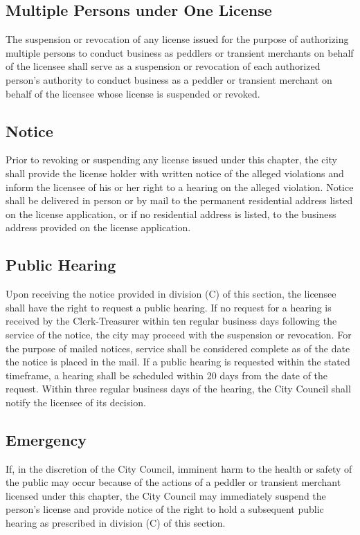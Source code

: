 \subsection{Multiple Persons under One License}
The suspension or revocation of any license issued for the purpose of authorizing multiple persons to conduct business as peddlers or transient merchants on behalf of the licensee shall serve as a suspension or revocation of each authorized person’s authority to conduct business as a peddler or transient merchant on behalf of the licensee whose license is suspended or revoked.
\subsection{Notice}
Prior to revoking or suspending any license issued under this chapter, the city shall provide the license holder with written notice of the alleged violations and inform the licensee of his or her right to a hearing on the alleged violation.  Notice shall be delivered in person or by mail to the permanent residential address listed on the license application, or if no residential address is listed, to the business address provided on the license application.
\subsection{Public Hearing}
Upon receiving the notice provided in division (C) of this section, the licensee shall have the right to request a public hearing.  If no request for a hearing is received by the Clerk-Treasurer within ten regular business days following the service of the notice, the city may proceed with the suspension or revocation.  For the purpose of mailed notices, service shall be considered complete as of the date the notice is placed in the mail.  If a public hearing is requested within the stated timeframe, a hearing shall be scheduled within 20 days from the date of the request.  Within three regular business days of the hearing, the City Council shall notify the licensee of its decision.
\subsection{Emergency}
If, in the discretion of the City Council, imminent harm to the health or safety of the public may occur because of the actions of a peddler or transient merchant licensed under this chapter, the City Council may immediately suspend the person’s license and provide notice of the right to hold a subsequent public hearing as prescribed in division (C) of this section.
